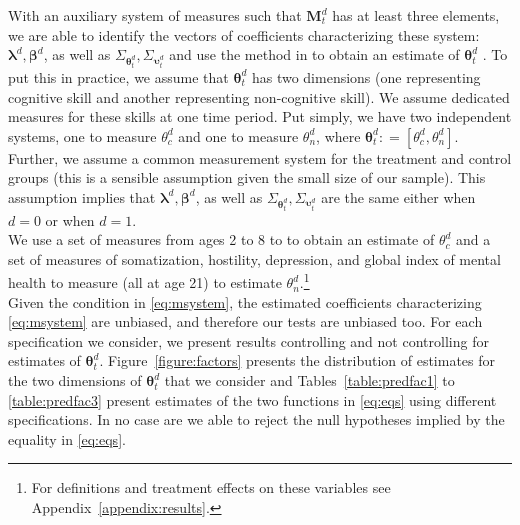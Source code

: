 \noindent With an auxiliary system of measures such that $\bm{M}_{t}^d $ has at least three elements, we are able to identify the vectors of coefficients characterizing these system: $\bm{\lambda}^d, \bm{\beta}^d$, as well as $\Sigma_{\bm{\theta}_{t}^d}, \Sigma_{\bm{\upsilon}_{t}^d}$ and use the method in \citet{Bartlett_1938_Nature} to obtain an estimate of $\bm{\theta}_{t}^d$ \citep{Cunha_Heckman_ea_2005_oep,Cunha_Heckman_etal_2010_est_tech_cognoncog}. To put this in practice, we assume that $\bm{\theta}_{t}^d$ has two dimensions (one representing cognitive skill and another representing non-cognitive skill). We assume dedicated measures for these skills at one time period. Put simply, we have two independent systems, one to measure $\theta_{c}^d$ and one to measure $\theta_{n}^d$, where $\bm{\theta}_{t}^d: = \left[ \theta_{c}^d, \theta_{n}^d \right]$. Further, we assume a common measurement system for the treatment and control groups (this is a sensible assumption given the small size of our sample). This assumption implies that $\bm{\lambda}^d, \bm{\beta}^d$, as well as $\Sigma_{\bm{\theta}_{t}^d}, \Sigma_{\bm{\upsilon}_{t}^d}$ are the same either when $d = 0$ or when $d = 1$.\\

\noindent We use a set of measures from ages 2 to 8 to to obtain an estimate of $\theta_{c}^d$ and a set of measures of somatization, hostility, depression, and global index of mental health to measure (all at age 21) to estimate $\theta_{n}^d$.\footnote{For definitions and treatment effects on these variables see Appendix~\ref{appendix:results}.}\\

\noindent Given the condition in \eqref{eq:msystem}, the estimated coefficients characterizing \eqref{eq:msystem} are unbiased, and therefore our tests are unbiased too. For each specification we consider, we present results controlling and not controlling for estimates of $\bm{\theta}_{t}^d$. Figure~\ref{figure:factors} presents the distribution of estimates for the two dimensions of $\bm{\theta}_{t}^d$ that we consider and Tables~\ref{table:predfac1} to \ref{table:predfac3} present estimates of the two functions in \eqref{eq:eqs} using different specifications. In no case are we able to reject the null hypotheses implied by the equality in \eqref{eq:eqs}.


